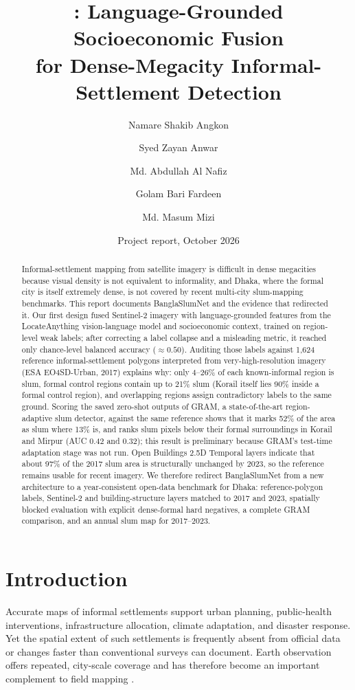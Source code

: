 \documentclass[11pt,a4paper]{article}
\title{\textbf{\project: Language-Grounded Socioeconomic Fusion\\
for Dense-Megacity Informal-Settlement Detection}}
\author{
Namare Shakib Angkon \and
Syed Zayan Anwar \and
Md. Abdullah Al Nafiz \and
Golam Bari Fardeen \and
Md. Masum Mizi
}
\date{Project report, October 2026}
\newcommand{\project}{BanglaSlumNet}
\begin{document}
\maketitle

\begin{abstract}
Informal-settlement mapping from satellite imagery is difficult in dense megacities because visual density is not equivalent to informality, and Dhaka, where the formal city is itself extremely dense, is not covered by recent multi-city slum-mapping benchmarks. This report documents \project{} and the evidence that redirected it. Our first design fused Sentinel-2 imagery with language-grounded features from the LocateAnything vision-language model and socioeconomic context, trained on region-level weak labels; after correcting a label collapse and a misleading metric, it reached only chance-level balanced accuracy ($\approx 0.50$). Auditing those labels against 1,624 reference informal-settlement polygons interpreted from very-high-resolution imagery (ESA EO4SD-Urban, 2017) explains why: only 4--26\% of each known-informal region is slum, formal control regions contain up to 21\% slum (Korail itself lies 90\% inside a formal control region), and overlapping regions assign contradictory labels to the same ground. Scoring the saved zero-shot outputs of GRAM, a state-of-the-art region-adaptive slum detector, against the same reference shows that it marks 52\% of the area as slum where 13\% is, and ranks slum pixels below their formal surroundings in Korail and Mirpur (AUC 0.42 and 0.32); this result is preliminary because GRAM's test-time adaptation stage was not run. Open Buildings 2.5D Temporal layers indicate that about 97\% of the 2017 slum area is structurally unchanged by 2023, so the reference remains usable for recent imagery. We therefore redirect \project{} from a new architecture to a year-consistent open-data benchmark for Dhaka: reference-polygon labels, Sentinel-2 and building-structure layers matched to 2017 and 2023, spatially blocked evaluation with explicit dense-formal hard negatives, a complete GRAM comparison, and an annual slum map for 2017--2023.
\end{abstract}

\section{Introduction}

Accurate maps of informal settlements support urban planning, public-health interventions, infrastructure allocation, climate adaptation, and disaster response. Yet the spatial extent of such settlements is frequently absent from official data or changes faster than conventional surveys can document. Earth observation offers repeated, city-scale coverage and has therefore become an important complement to field mapping \citep{kuffer2016slums,mahabir2018critical}.
\end{document}
